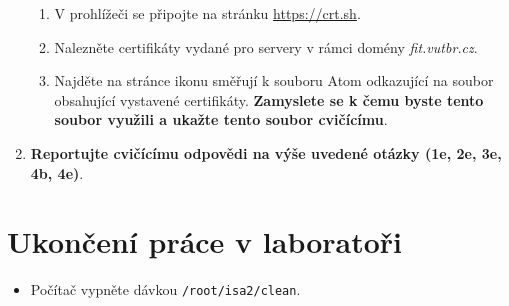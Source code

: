 \documentclass[a4paper,11pt]{article}
\begin{document}
\begin{enumerate}
\begin{enumerate}
      \item V prohlížeči se připojte na stránku \url{https://crt.sh}.

      \item Nalezněte certifikáty vydané pro servery v rámci domény
        \emph{fit.vutbr.cz}.

      \item Najděte na stránce ikonu směřují k souboru Atom odkazující na soubor
        obsahující vystavené certifikáty. {\bf Zamyslete se k čemu byste tento soubor
        využili a ukažte tento soubor cvičícímu}.

    \end{enumerate}

  \item {\bf Reportujte cvičícímu odpovědi na výše uvedené otázky (1e, 2e, 3e, 4b,
    4e)}.
\end{enumerate}



\section{Ukončení práce v laboratoři}
\begin{itemize}
  \item Počítač vypněte dávkou {\tt /root/isa2/clean}.
\end{itemize}
\end{document}
